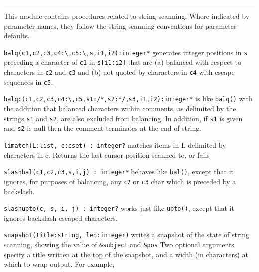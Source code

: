 \vspace{0.25cm}\hrule{}

This module contains procedures related to string
scanning: Where indicated by parameter names, they follow the string
scanning conventions for parameter defaults.

\texttt{balq(c1,c2,c3,c4:{\textquotesingle}{\textbackslash}{\textquotesingle}{\textquotedbl}{\textquotesingle},c5:{\textquotesingle}{\textbackslash}{\textquotesingle},s,i1,i2):integer*}
generates integer positions in \texttt{s} preceding a character of
\texttt{c1} in \texttt{s[i1:i2]} that are (a) balanced with respect to
characters in \texttt{c2} and \texttt{c3} and (b) not
{\textquotedbl}quoted{\textquotedbl} by characters in \texttt{c4} with
{\textquotedbl}escape{\textquotedbl} sequences in
\texttt{c5}.

\texttt{balqc(c1,c2,c3,c4:{\textquotesingle}{\textbackslash}{\textquotesingle}{\textquotedbl}{\textquotesingle},c5,s1:{\textquotedbl}/*{\textquotedbl},s2:{\textquotedbl}*/{\textquotedbl},s3,i1,i2):integer*}
is like \texttt{balq()} with the addition that balanced characters
within {\textquotedbl}comments{\textquotedbl}, as delimited by the
strings \texttt{s1} and \texttt{s2}, are also excluded from balancing.
In addition, if \texttt{s1} is given and \texttt{s2} is null then the
comment terminates at the end of string.

\texttt{limatch(L:list, c:cset) : integer?} matches items in L delimited
by characters in c. Returns the last cursor position scanned to, or
fails 

\texttt{slashbal(c1,c2,c3,s,i,j) : integer*} behaves like
\texttt{bal()}, except that it ignores, for purposes of balancing, any
\texttt{c2} or \texttt{c3} char which is preceded by a backslash.

\texttt{slashupto(c, s, i, j) : integer?} works just like
\texttt{upto()}, except that it ignores backslash escaped characters.

\texttt{snapshot(title:string, len:integer)} writes a snapshot of the
state of string scanning, showing the value of \texttt{\&subject} and
\texttt{\&pos} Two optional arguments specify a title written at the
top of the snapshot, and a width (in characters) at which to wrap
output. For example,


